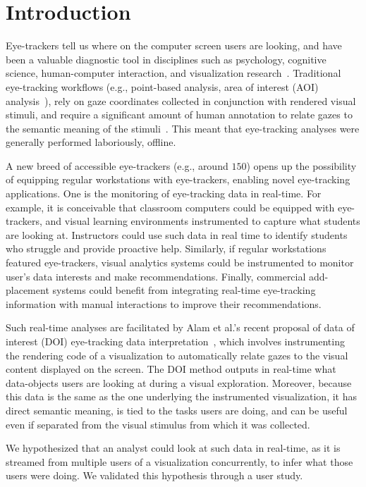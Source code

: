 \section{Introduction}
\label{sec:Introduction}

Eye-trackers tell us where on the computer screen users are looking, and have been a valuable diagnostic tool in disciplines such as psychology, cognitive science, human-computer interaction, and visualization research~\cite{duchowski2002breadth}. Traditional eye-tracking workflows (e.g., point-based analysis, area of interest (AOI) analysis~\cite{blascheckstate}), rely on gaze coordinates collected in conjunction with rendered visual stimuli, and require a significant amount of human annotation to relate gazes to the semantic meaning of the stimuli~\cite{alamdata}. This meant  that eye-tracking analyses were generally performed laboriously, offline.  

A new breed of accessible eye-trackers (e.g., around $150$) opens up the possibility of equipping regular workstations with eye-trackers, enabling novel eye-tracking applications. One is the monitoring of eye-tracking data in real-time. For example, it is conceivable that classroom computers could be equipped with eye-trackers, and visual learning environments instrumented to capture what students are looking at. Instructors could use such data in real time to identify students who struggle and provide proactive help. Similarly, if regular workstations featured eye-trackers, visual analytics systems could be instrumented to monitor user's data interests and make recommendations. Finally, commercial add-placement systems could benefit from integrating real-time eye-tracking information with manual interactions to improve their recommendations.

Such real-time analyses are facilitated by  Alam et al.'s recent proposal of data of interest (DOI) eye-tracking data interpretation~\cite{alamdata}, which involves instrumenting the rendering code of a visualization to automatically relate gazes to the visual content displayed on the screen. The DOI method outputs in real-time what data-objects users are looking at during a visual exploration. Moreover, because this data is the same as the one underlying the instrumented visualization, it has direct semantic meaning, is tied to the tasks users are doing, and can be useful even if separated from the visual stimulus from which it was collected. 

We hypothesized that an analyst could look at such data in real-time, as it is streamed from multiple users of a visualization concurrently, to infer what those users were doing. We validated this hypothesis through a user study.   
 

 
